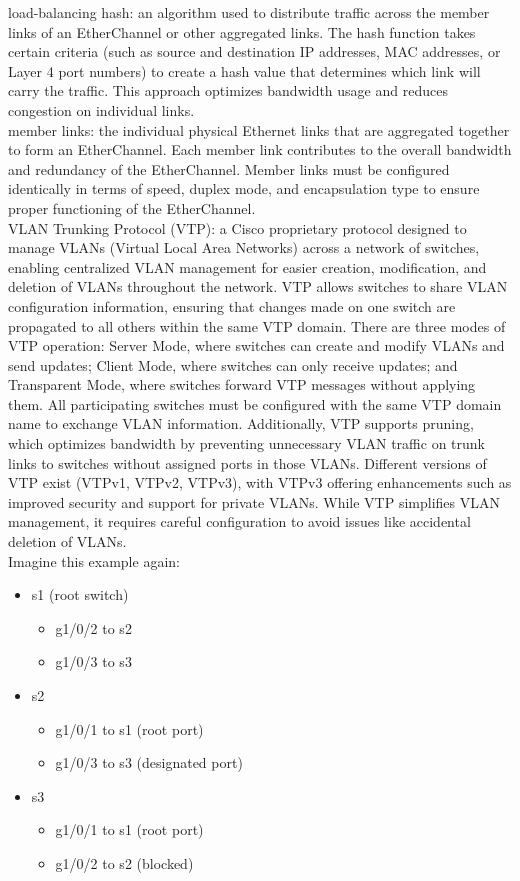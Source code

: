 \documentclass{article}
\begin{document}
load-balancing hash: an algorithm used to distribute traffic across the member links of an EtherChannel or other aggregated links. The hash function takes certain criteria (such as source and destination IP addresses, MAC addresses, or Layer 4 port numbers) to create a hash value that determines which link will carry the traffic. This approach optimizes bandwidth usage and reduces congestion on individual links.\\

member links: the individual physical Ethernet links that are aggregated together to form an EtherChannel. Each member link contributes to the overall bandwidth and redundancy of the EtherChannel. Member links must be configured identically in terms of speed, duplex mode, and encapsulation type to ensure proper functioning of the EtherChannel.\\

VLAN Trunking Protocol (VTP): a Cisco proprietary protocol designed to manage VLANs (Virtual Local Area Networks) across a network of switches, enabling centralized VLAN management for easier creation, modification, and deletion of VLANs throughout the network. VTP allows switches to share VLAN configuration information, ensuring that changes made on one switch are propagated to all others within the same VTP domain. There are three modes of VTP operation: Server Mode, where switches can create and modify VLANs and send updates; Client Mode, where switches can only receive updates; and Transparent Mode, where switches forward VTP messages without applying them. All participating switches must be configured with the same VTP domain name to exchange VLAN information. Additionally, VTP supports pruning, which optimizes bandwidth by preventing unnecessary VLAN traffic on trunk links to switches without assigned ports in those VLANs. Different versions of VTP exist (VTPv1, VTPv2, VTPv3), with VTPv3 offering enhancements such as improved security and support for private VLANs. While VTP simplifies VLAN management, it requires careful configuration to avoid issues like accidental deletion of VLANs.\\

\noindent Imagine this example again:
\begin{itemize}
\item s1 (root switch)
	\begin{itemize}
	\item g1/0/2 to s2
	\item g1/0/3 to s3
	\end{itemize}
\item s2
	\begin{itemize}
	\item g1/0/1 to s1 (root port)
	\item g1/0/3 to s3 (designated port)
	\end{itemize}
\item s3
	\begin{itemize}
	\item g1/0/1 to s1 (root port)
	\item g1/0/2 to s2 (blocked)
	\end{itemize}
\end{itemize}
\end{document}
